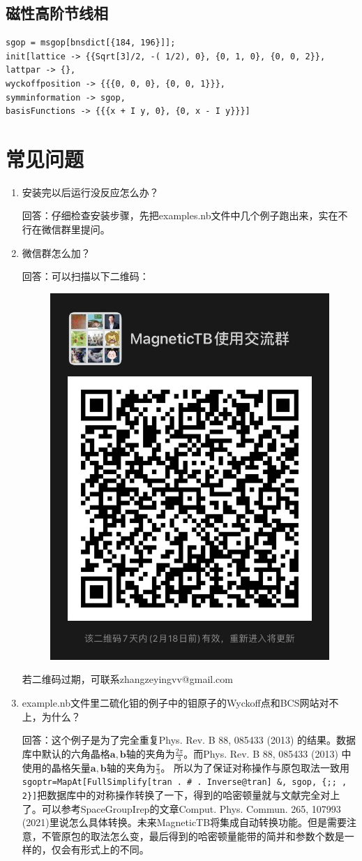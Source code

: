 \documentclass[titlepage,a4paper,12pt,AutoFakeBold]{article}
\newcommand\litem[1]{\item{ #1？\\}}
\begin{document}
\subsection{磁性高阶节线相}
\begin{lstlisting}
sgop = msgop[bnsdict[{184, 196}]];
init[lattice -> {{Sqrt[3]/2, -( 1/2), 0}, {0, 1, 0}, {0, 0, 2}},
lattpar -> {},
wyckoffposition -> {{{0, 0, 0}, {0, 0, 1}}},
symminformation -> sgop,
basisFunctions -> {{{x + I y, 0}, {0, x - I y}}}]
\end{lstlisting}
\fi

\section{常见问题}
    \begin{enumerate}[style=nextline]
    \setlength\itemsep{1.5em}
	\litem{安装完以后运行没反应怎么办} 
	
	回答：仔细检查安装步骤，先把examples.nb文件中几个例子跑出来，实在不行在微信群里提问。
	
	\litem{微信群怎么加} 
	
	回答：可以扫描以下二维码：
	\begin{figure}[H]
		\centering
		\includegraphics[width=.3\textwidth]{./figures/wechat}
	\end{figure}
	若二维码过期，可联系zhangzeyingvv@gmail.com
	
	\litem{example.nb文件里二硫化钼的例子中的钼原子的Wyckoff点和BCS网站对不上，为什么}
	
	回答：这个例子是为了完全重复Phys. Rev. B 88, 085433 (2013) 的结果。数据库中默认的六角晶格$\boldsymbol{a}, \boldsymbol{b}$轴的夹角为$\frac{2\pi}{3}$。而Phys. Rev. B 88, 085433 (2013) 中使用的晶格矢量$\boldsymbol{a}, \boldsymbol{b}$轴的夹角为$\frac{\pi}{3}$。 所以为了保证对称操作与原包取法一致用\lstinline|sgoptr=MapAt[FullSimplify[tran . # . Inverse@tran] &, sgop, {;; , 2}]|把数据库中的对称操作转换了一下，得到的哈密顿量就与文献完全对上了。可以参考\textsf{SpaceGroupIrep}的文章Comput. Phys. Commun. 265, 107993  (2021)里说怎么具体转换。未来\textsf{MagneticTB}将集成自动转换功能。但是需要注意，不管原包的取法怎么变，最后得到的哈密顿量能带的简并和参数个数是一样的，仅会有形式上的不同。
	

\end{enumerate}
\end{document}
